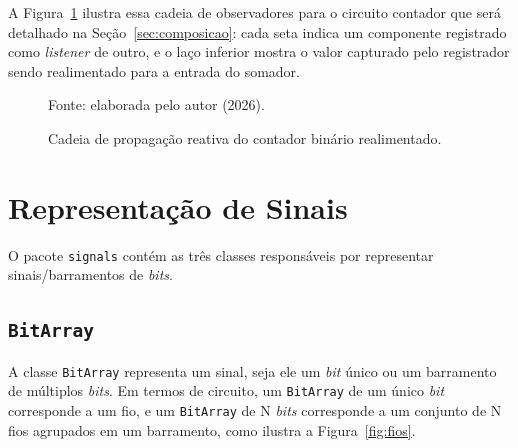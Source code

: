 A Figura~\ref{fig:propagacao} ilustra essa cadeia de observadores para o circuito contador que será detalhado na Seção~\ref{sec:composicao}: cada seta indica um componente registrado como \textit{listener} de outro, e o laço inferior mostra o valor capturado pelo registrador sendo realimentado para a entrada do somador.

\begin{figure}[H]
\centering
\caption{Cadeia de propagação reativa do contador binário realimentado.}
\label{fig:propagacao}
\begin{center}
\footnotesize Fonte: elaborada pelo autor (2026).
\end{center}
\end{figure}

\section{Representação de Sinais}
\label{sec:sinais}

O pacote \texttt{signals} contém as três classes responsáveis por representar sinais/barramentos de \textit{bits}.

\subsection{\texttt{BitArray}}

A classe \texttt{BitArray} representa um sinal, seja ele um \textit{bit} único ou um barramento de múltiplos \textit{bits}. Em termos de circuito, um \texttt{BitArray} de um único \textit{bit} corresponde a um fio, e um \texttt{BitArray} de N \textit{bits} corresponde a um conjunto de N fios agrupados em um barramento, como ilustra a Figura~\ref{fig:fios}.

